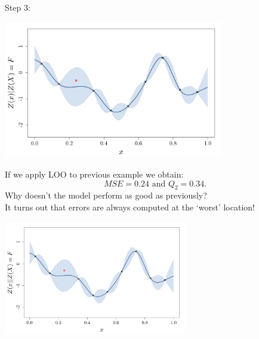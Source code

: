 \begin{frame}{}
Step 3:\\ \vspace{3mm}
\begin{center}
\includegraphics[height=6cm]{3_gaussian_process_regression/figures/R/VALID_crossval3}
\end{center}
\end{frame}

\begin{frame}{}
If we apply LOO to previous example we obtain:
 $$MSE = 0.24 \text{ and } Q_2 = 0.34.$$
Why doesn't the model perform as good as previously?\\
\vspace{5mm}
\pause
It turns out that errors are always computed at the `worst' location!
\begin{center}
\includegraphics[height=5cm]{3_gaussian_process_regression/figures/R/VALID_crossval3}
\end{center}
\end{frame}

